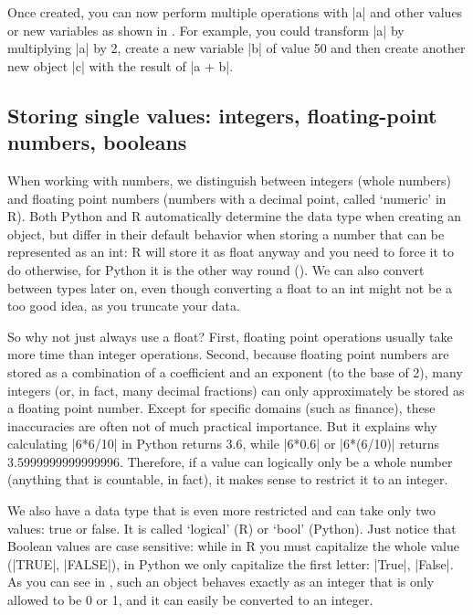Once created, you can now perform multiple operations
with |a| and other values or new variables as shown in . For example, you
could transform |a| by multiplying |a| by 2, create a new
variable |b| of value 50 and then create another new object
|c| with the result of |a + b|.





\subsection{Storing single values: integers, floating-point numbers, booleans}

When working with numbers, we distinguish between integers (whole
numbers) and floating point numbers (numbers with a decimal point,
called `numeric' in R). Both Python and R automatically determine the
data type when creating an object, but differ in their default
behavior when storing a number that can be represented as an int: R
will store it as float anyway and you need to force it to do
otherwise, for Python it is the other way round
(). We can also convert between types later on,
even though converting a float to an int might not be a too good idea,
as you truncate your data.

So why not just always use a float? First,
floating point operations usually take more time than integer operations.
Second, because floating point numbers are stored as a combination of
a coefficient and an exponent (to the base of 2), many integers (or,
in fact, many decimal fractions) can only approximately be stored
as a floating point number. Except for specific domains (such
as finance), these inaccuracies are often not of much practical importance.
But it explains why calculating |6*6/10| in Python returns 3.6, while
|6*0.6| or |6*(6/10)| returns 3.5999999999999996. Therefore, if
a value can logically only be a whole number (anything that is
countable, in fact), it makes sense to restrict it to an integer.

We also have a data type that is even more restricted and can take
only two values: true or false. It is called `logical' (R) or `bool'
(Python).  Just notice that Boolean values are case sensitive:
while in R you must capitalize the whole value (|TRUE|, |FALSE|), in
Python we only capitalize the first letter: |True|, |False|.  As you can
see in , such an object behaves exactly as an integer that
is only allowed to be 0 or 1, and it can easily be converted to an
integer.

